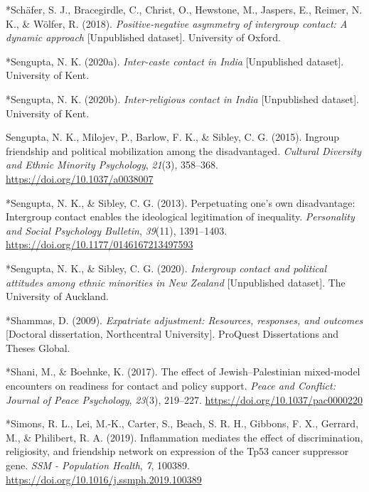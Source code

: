 \documentclass[12pt, letterpaper]{article}
\begin{document}
\leavevmode\hypertarget{ref-2382}{}%
*Schäfer, S. J., Bracegirdle, C., Christ, O., Hewstone, M., Jaspers, E.,
Reimer, N. K., \& Wölfer, R. (2018). \emph{Positive-negative asymmetry
of intergroup contact: A dynamic approach} {[}Unpublished dataset{]}.
University of Oxford.

\leavevmode\hypertarget{ref-2392}{}%
*Sengupta, N. K. (2020a). \emph{Inter-caste contact in India}
{[}Unpublished dataset{]}. University of Kent.

\leavevmode\hypertarget{ref-2385}{}%
*Sengupta, N. K. (2020b). \emph{Inter-religious contact in India}
{[}Unpublished dataset{]}. University of Kent.

\leavevmode\hypertarget{ref-sengupta_ingroup_2015}{}%
Sengupta, N. K., Milojev, P., Barlow, F. K., \& Sibley, C. G. (2015).
Ingroup friendship and political mobilization among the disadvantaged.
\emph{Cultural Diversity and Ethnic Minority Psychology}, \emph{21}(3),
358--368. \url{https://doi.org/10.1037/a0038007}

\leavevmode\hypertarget{ref-1695}{}%
*Sengupta, N. K., \& Sibley, C. G. (2013). Perpetuating one's own
disadvantage: Intergroup contact enables the ideological legitimation of
inequality. \emph{Personality and Social Psychology Bulletin},
\emph{39}(11), 1391--1403.
\url{https://doi.org/10.1177/0146167213497593}

\leavevmode\hypertarget{ref-2381}{}%
*Sengupta, N. K., \& Sibley, C. G. (2020). \emph{Intergroup contact and
political attitudes among ethnic minorities in New Zealand}
{[}Unpublished dataset{]}. The University of Auckland.

\leavevmode\hypertarget{ref-1891}{}%
*Shammas, D. (2009). \emph{Expatriate adjustment: Resources, responses,
and outcomes} {[}Doctoral dissertation, Northcentral University{]}.
ProQuest Dissertations and Theses Global.

\leavevmode\hypertarget{ref-789}{}%
*Shani, M., \& Boehnke, K. (2017). The effect of Jewish--Palestinian
mixed-model encounters on readiness for contact and policy support.
\emph{Peace and Conflict: Journal of Peace Psychology}, \emph{23}(3),
219--227. \url{https://doi.org/10.1037/pac0000220}

\leavevmode\hypertarget{ref-3060}{}%
*Simons, R. L., Lei, M.-K., Carter, S., Beach, S. R. H., Gibbons, F. X.,
Gerrard, M., \& Philibert, R. A. (2019). Inflammation mediates the
effect of discrimination, religiosity, and friendship network on
expression of the Tp53 cancer suppressor gene. \emph{SSM - Population
Health}, \emph{7}, 100389.
\url{https://doi.org/10.1016/j.ssmph.2019.100389}
\end{document}
